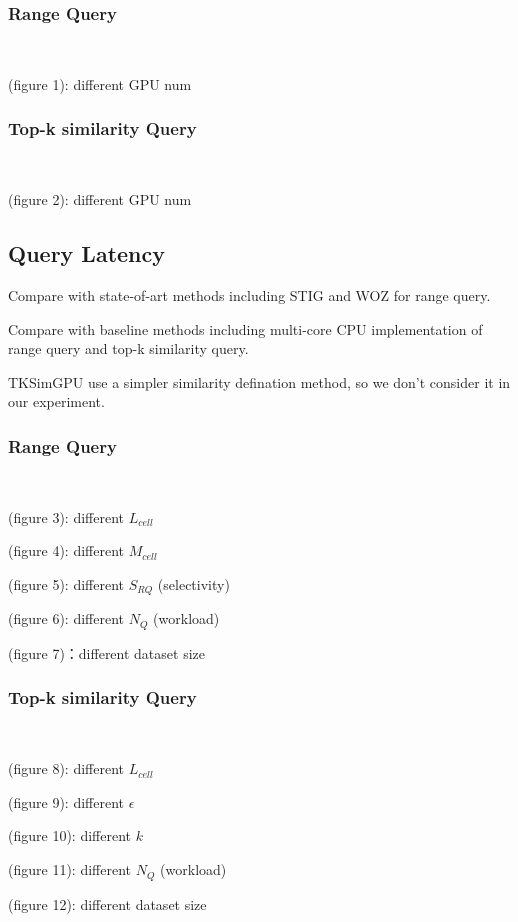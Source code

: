 \documentclass[conference]{IEEEtran}
\begin{document}
\subsubsection{Range Query}$  $

(figure 1): different GPU num

\subsubsection{Top-k similarity Query}$  $

(figure 2): different GPU num

\subsection{Query Latency}

Compare with state-of-art methods including STIG and WOZ for range query.

Compare with baseline methods including multi-core CPU implementation of range query and top-k similarity query.

TKSimGPU use a simpler similarity defination method, so we don't consider it in our experiment. 

\subsubsection{Range Query}
$  $

(figure 3): different $L_{cell}$

(figure 4): different $M_{cell}$

(figure 5): different $S_{RQ}$ (selectivity)

(figure 6): different $N_Q$ (workload)

(figure 7)：different dataset size

\subsubsection{Top-k similarity Query}
$  $

(figure 8): different $L_{cell}$

(figure 9): different $\epsilon$

(figure 10): different $k$ 

(figure 11): different $N_{Q}$ (workload)

(figure 12): different dataset size
\end{document}
